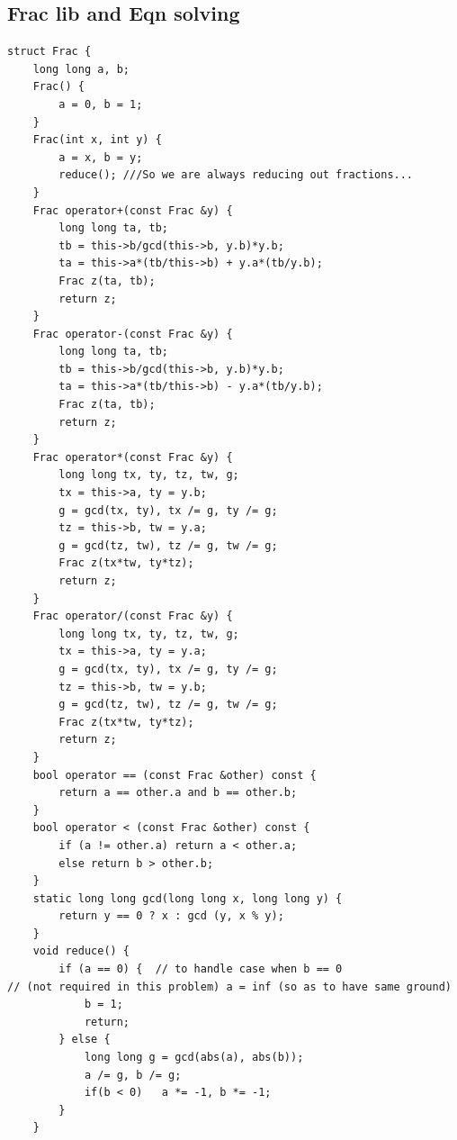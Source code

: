 \documentclass[8pt, a4paper, oneside, twocolumn]{extarticle}
\begin{document}
\subsection{Frac lib and Eqn solving}
\begin{verbatim}
struct Frac {
    long long a, b;
    Frac() {
        a = 0, b = 1;
    }
    Frac(int x, int y) {
        a = x, b = y;
        reduce(); ///So we are always reducing out fractions...
    }
    Frac operator+(const Frac &y) {
        long long ta, tb;
        tb = this->b/gcd(this->b, y.b)*y.b;
        ta = this->a*(tb/this->b) + y.a*(tb/y.b);
        Frac z(ta, tb);
        return z;
    }
    Frac operator-(const Frac &y) {
        long long ta, tb;
        tb = this->b/gcd(this->b, y.b)*y.b;
        ta = this->a*(tb/this->b) - y.a*(tb/y.b);
        Frac z(ta, tb);
        return z;
    }
    Frac operator*(const Frac &y) {
        long long tx, ty, tz, tw, g;
        tx = this->a, ty = y.b;
        g = gcd(tx, ty), tx /= g, ty /= g;
        tz = this->b, tw = y.a;
        g = gcd(tz, tw), tz /= g, tw /= g;
        Frac z(tx*tw, ty*tz);
        return z;
    }
    Frac operator/(const Frac &y) {
        long long tx, ty, tz, tw, g;
        tx = this->a, ty = y.a;
        g = gcd(tx, ty), tx /= g, ty /= g;
        tz = this->b, tw = y.b;
        g = gcd(tz, tw), tz /= g, tw /= g;
        Frac z(tx*tw, ty*tz);
        return z;
    }
    bool operator == (const Frac &other) const {
        return a == other.a and b == other.b;
    }
    bool operator < (const Frac &other) const {
        if (a != other.a) return a < other.a;
        else return b > other.b;
    }
    static long long gcd(long long x, long long y) {
        return y == 0 ? x : gcd (y, x % y);
    }
    void reduce() {
        if (a == 0) {  // to handle case when b == 0 
// (not required in this problem) a = inf (so as to have same ground)
            b = 1;
            return;
        } else {
            long long g = gcd(abs(a), abs(b));
            a /= g, b /= g;
            if(b < 0)   a *= -1, b *= -1;
        }
    }


\end{verbatim}
\end{document}
